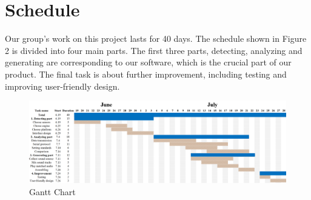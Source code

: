 \section{Schedule}
Our group's work on this project lasts for 40 days. The schedule shown in Figure 2 is divided into four main parts. The first three parts, detecting, analyzing and generating are corresponding to our software, which is the crucial part of our product. The final task is about further improvement, including testing and improving user-friendly design.
\begin{figure}
    \centering
    \includegraphics[width=13cm]{Gantt}
    \caption{Gantt Chart}
    \label{scalerStep}
\end{figure}
